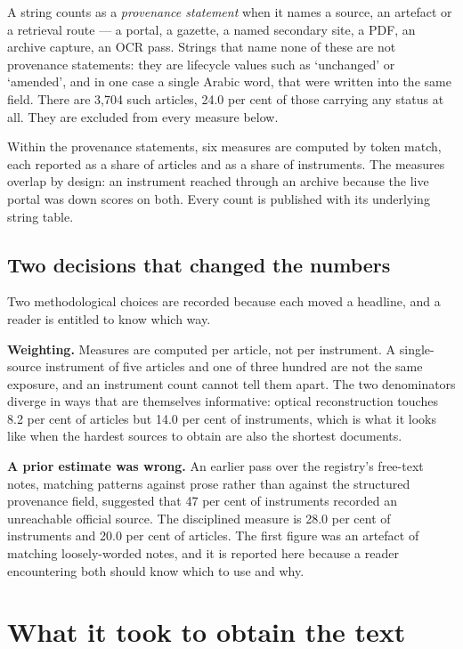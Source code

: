 \documentclass[11pt]{article}
\begin{document}
A string counts as a \emph{provenance statement} when it names a source, an
artefact or a retrieval route --- a portal, a gazette, a named secondary site, a
PDF, an archive capture, an OCR pass. Strings that name none of these are not
provenance statements: they are lifecycle values such as `unchanged' or
`amended', and in one case a single Arabic word, that were written into the
same field. There are 3,704 such articles, 24.0 per cent of those carrying any
status at all. They are excluded from every measure below.

Within the provenance statements, six measures are computed by token match,
each reported as a share of articles and as a share of instruments. The
measures overlap by design: an instrument reached through an archive because
the live portal was down scores on both. Every count is published with its
underlying string table.

\subsection{Two decisions that changed the numbers}

Two methodological choices are recorded because each moved a headline, and a
reader is entitled to know which way.

\textbf{Weighting.} Measures are computed per article, not per instrument. A
single-source instrument of five articles and one of three hundred are not the
same exposure, and an instrument count cannot tell them apart. The two
denominators diverge in ways that are themselves informative: optical
reconstruction touches 8.2 per cent of articles but 14.0 per cent of
instruments, which is what it looks like when the hardest sources to obtain are
also the shortest documents.

\textbf{A prior estimate was wrong.} An earlier pass over the registry's
free-text notes, matching patterns against prose rather than against the
structured provenance field, suggested that 47 per cent of instruments recorded
an unreachable official source. The disciplined measure is 28.0 per cent of
instruments and 20.0 per cent of articles. The first figure was an artefact of
matching loosely-worded notes, and it is reported here because a reader
encountering both should know which to use and why.

\section{What it took to obtain the text}
\end{document}
